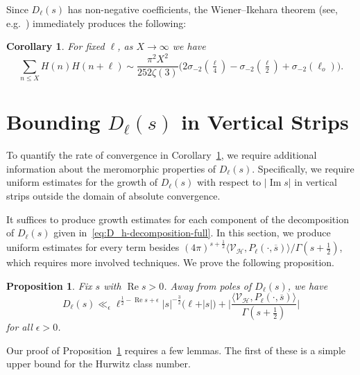 \documentclass[11pt,reqno]{amsart}
\theoremstyle{plain}
\newtheorem{proposition}[theorem]{Proposition}
\newtheorem{corollary}[theorem]{Corollary}
\theoremstyle{definition}
\numberwithin{equation}{section}
\renewcommand{\Im}{\operatorname{Im}}
\renewcommand{\Re}{\operatorname{Re}}
\begin{document}
Since $D_\ell(s)$ has non-negative coefficients, the Wiener--Ikehara theorem (see, e.g.~\cite[Corollary 8.8]{MontgomeryVaughn06}) immediately produces the following:

\begin{corollary} \label{cor:Wiener-Ikehara}
For fixed $\ell$, as $X \to \infty$ we have
\[
	\sum_{n \leq X} H(n)H(n+\ell)
		\sim \frac{\pi^2 X^2}{252\zeta(3)}
				\big(2\sigma_{-2}(\tfrac{\ell}{4}) - \sigma_{-2}(\tfrac{\ell}{2})+\sigma_{-2}(\ell_o) \big).
\]
\end{corollary}


\section{Bounding \texorpdfstring{$D_\ell(s)$}{Dh(s)} in Vertical Strips} \label{sec:D_h-growth-bounds}

To quantify the rate of convergence in Corollary~\ref{cor:Wiener-Ikehara}, we require additional information about the meromorphic properties of $D_\ell(s)$. Specifically, we require uniform estimates for the growth of $D_\ell(s)$ with respect to $\vert \Im s \vert$ in vertical strips outside the domain of absolute convergence.

It suffices to produce growth estimates for each component of the decomposition of $D_\ell(s)$ given in~\eqref{eq:D_h-decomposition-full}. In this section, we produce uniform estimates for every term besides $(4\pi)^{s+\frac{1}{2}} \langle \mathcal{V}_\mathcal{H}, P_\ell(\cdot, \overline{s}) \rangle / \Gamma(s+\frac{1}{2})$, which requires more involved techniques. We prove the following proposition.

\begin{proposition} \label{prop:D_h-preliminary-growth}
Fix $s$ with $\Re s > 0$. Away from poles of $D_\ell(s)$, we have
\[
	D_\ell(s) \ll_\epsilon
		\ell^{\frac{1}{2}-\Re s + \epsilon} \vert s \vert^{-\frac{3}{2}}
		\big(\ell
		+ \vert s \vert \big)
		+ \Big\vert
			\frac{\langle \mathcal{V}_\mathcal{H}, P_\ell(\cdot, \overline{s}) \rangle}{\Gamma(s+\frac{1}{2})}
			\Big\vert
\]
for all $\epsilon > 0$.
\end{proposition}

Our proof of Proposition~\ref{prop:D_h-preliminary-growth} requires a few lemmas. The first of these is a simple upper bound for the Hurwitz class number.
\end{document}
